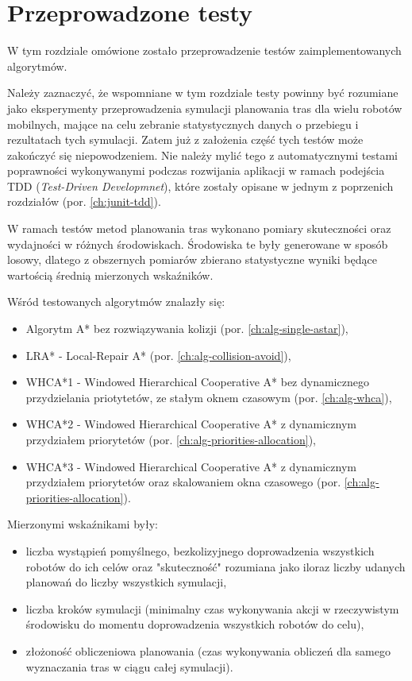\chapter{Przeprowadzone testy}
\label{ch:tests}
W tym rozdziale omówione zostało przeprowadzenie testów zaimplementowanych algorytmów.

Należy zaznaczyć, że wspomniane w tym rozdziale testy powinny być rozumiane jako eksperymenty przeprowadzenia symulacji planowania tras dla wielu robotów mobilnych, mające na celu zebranie statystycznych danych o przebiegu i rezultatach tych symulacji. Zatem już z założenia część tych testów może zakończyć się niepowodzeniem.
Nie należy mylić tego z automatycznymi testami poprawności wykonywanymi podczas rozwijania aplikacji w ramach podejścia TDD ({\it Test-Driven Developmnet}), które zostały opisane w jednym z poprzenich rozdziałów (por. \ref{ch:junit-tdd}).

W ramach testów metod planowania tras wykonano pomiary skuteczności oraz wydajności w różnych środowiskach. 
Środowiska te były generowane w sposób losowy, dlatego z obszernych pomiarów zbierano statystyczne wyniki będące wartością średnią mierzonych wskaźników.

Wśród testowanych algorytmów znalazły się:
\begin{itemize}
	\item Algorytm A* bez rozwiązywania kolizji (por. \ref{ch:alg-single-astar}),
	\item LRA* - Local-Repair A* (por. \ref{ch:alg-collision-avoid}),
	\item WHCA*1 - Windowed Hierarchical Cooperative A* bez dynamicznego przydzielania priotytetów, ze stałym oknem czasowym (por. \ref{ch:alg-whca}),
	\item WHCA*2 - Windowed Hierarchical Cooperative A* z dynamicznym przydziałem priorytetów (por. \ref{ch:alg-priorities-allocation}),
	\item WHCA*3 - Windowed Hierarchical Cooperative A* z dynamicznym przydziałem priorytetów oraz skalowaniem okna czasowego (por. \ref{ch:alg-priorities-allocation}).
\end{itemize}

Mierzonymi wskaźnikami były:
\begin{itemize}
	\item liczba wystąpień pomyślnego, bezkolizyjnego doprowadzenia wszystkich robotów do ich celów oraz "skuteczność" rozumiana jako iloraz liczby udanych planowań do liczby wszystkich symulacji,
	\item liczba kroków symulacji (minimalny czas wykonywania akcji w rzeczywistym środowisku do momentu doprowadzenia wszystkich robotów do celu),
	\item złożoność obliczeniowa planowania (czas wykonywania obliczeń dla samego wyznaczania tras w ciągu całej symulacji).
\end{itemize}


